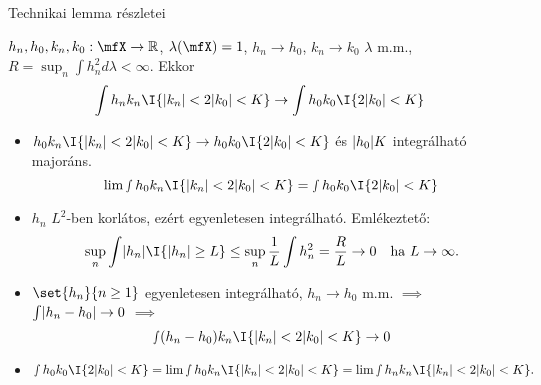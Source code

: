 \documentclass[aspectratio=169,notheorems,9pt,\option]{beamer}
\begin{document}
\begin{frame}{Technikai lemma részletei}
  \begin{proposition}
    $h_n,h_0,k_n,k_0:\mfX\to\real$, \alert{$\lambda(\mfX)=1$},
    $h_n\to h_0$, $k_n\to k_0$ $\lambda$ m.m., 
    $R=\sup_n \int h_n^2d\lambda<\infty$. Ekkor
    \begin{displaymath}
      \int h_n k_n\I{\abs{k_n}<2\abs{k_0}<K}\to \int h_0 k_0\I{2\abs{k_0}<K}  
    \end{displaymath}
  \end{proposition}
  \begin{itemize}
    \item $h_0 k_n\I{\abs{k_n}<2\abs{k_0}<K}\to h_0k_0\I{2\abs{k_0}<K}$ és $\lvert h_0\rvert K$ integrálható majoráns.
    \begin{displaymath}
      \lim \smallint h_0 k_n\I{\abs{k_n}<2\abs{k_0}<K} =\smallint h_0k_0\I{2\abs{k_0}<K}
    \end{displaymath}
    \item $h_n$ $L^2$-ben korlátos, ezért egyenletesen integrálható. Emlékeztető:
    \begin{displaymath}
      \sup_n\int \abs{h_n} \I{\abs{h_n}\geq L}\leq \sup_n\frac1L\int h_n^2=\frac{R}{L}\to0\quad \text{ha $L\to\infty$}.
    \end{displaymath}
    \item $\set{h_n}{n\geq1}$ egyenletesen integrálható, $h_n\to h_0$ m.m. $\implies$ $\int \lvert h_n-h_0\rvert\to0$ $\implies$
    \begin{displaymath}
      \smallint (h_n-h_0) k_n\I{\abs{k_n}<2\abs{k_0}<K}\to0
    \end{displaymath}
    \item 
    \begin{displaymath}
      \smallint h_0k_0\I{2\abs{k_0}<K}
      =\lim \smallint h_0 k_n\I{\abs{k_n}<2\abs{k_0}<K}
      =\lim \smallint h_n k_n\I{\abs{k_n}<2\abs{k_0}<K}.
    \end{displaymath}
  \end{itemize}
\end{frame}
\end{document}
